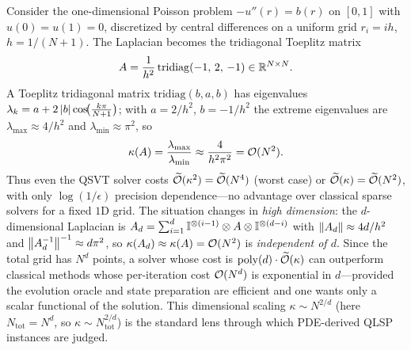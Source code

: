 \begin{example}
\label{exa:lec10-poisson}
Consider the one-dimensional Poisson problem $-u''(r)=b(r)$ on $[0,1]$ with $u(0)=u(1)=0$,
discretized by central differences on a uniform grid $r_i=ih$, $h=1/(N+1)$. The
Laplacian becomes the tridiagonal Toeplitz matrix
\begin{equation}
  A=\frac1{h^2}\,\mathrm{tridiag}(-1,\,2,\,-1)\in\mathbb{R}^{N\times N}.
  \label{eq:lec10-lap}
\end{equation}
A Toeplitz tridiagonal matrix $\mathrm{tridiag}(b,a,b)$ has eigenvalues
$\lambda_k=a+2\left\lvert b \right\rvert\cos\!\bigl(\tfrac{k\pi}{N+1}\bigr)$; with $a=2/h^2$, $b=-1/h^2$ the
extreme eigenvalues are $\lambda_{\max}\approx4/h^2$ and $\lambda_{\min}\approx\pi^2$,
so
\begin{equation}
  \kappa(A)=\frac{\lambda_{\max}}{\lambda_{\min}}\approx\frac{4}{h^2\pi^2}=\mathcal{O}(N^2).
  \label{eq:lec10-poisson-kappa}
\end{equation}
Thus even the QSVT solver costs $\widetilde{\mathcal{O}}(\kappa^2)=\widetilde{\mathcal{O}}(N^4)$
(worst case) or $\widetilde{\mathcal{O}}(\kappa)=\widetilde{\mathcal{O}}(N^2)$, with only
$\log(1/\epsilon)$ precision dependence---no advantage over classical sparse solvers for
a fixed $1$D grid. The situation changes in \emph{high dimension}: the $d$-dimensional
Laplacian is $A_d=\sum_{i=1}^{d}\mathbb{I}^{\otimes(i-1)}\otimes A\otimes\mathbb{I}^{\otimes(d-i)}$
with $\left\lVert A_d \right\rVert\approx4d/h^2$ and $\left\lVert A_d^{-1} \right\rVert^{-1}\approx d\pi^2$, so
$\kappa(A_d)\approx\kappa(A)=\mathcal{O}(N^2)$ is \emph{independent of $d$}. Since the total
grid has $N^d$ points, a solver whose cost is $\operatorname{poly}(d)\cdot\widetilde{\mathcal{O}}(\kappa)$
can outperform classical methods whose per-iteration cost $\mathcal{O}(N^d)$ is exponential
in $d$---provided the evolution oracle and state preparation are efficient and one wants
only a scalar functional of the solution. This dimensional scaling $\kappa\sim N^{2/d}$
(here $N_{\mathrm{tot}}=N^d$, so $\kappa\sim N_{\mathrm{tot}}^{2/d}$) is the standard
lens through which PDE-derived QLSP instances are judged.
\end{example}

